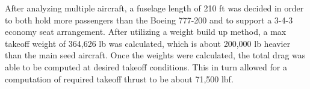 After analyzing multiple aircraft, a fuselage length of 210 ft was decided in order to both hold more passengers than the Boeing 777-200 and to support a 3-4-3 economy seat arrangement. After utilizing a weight build up method, a max takeoff weight of 364,626 lb was calculated, which is about 200,000 lb heavier than the main seed aircraft. Once the weights were calculated, the total drag was able to be computed at desired takeoff conditions. This in turn allowed for a computation of required takeoff thrust to be about 71,500 lbf. 


